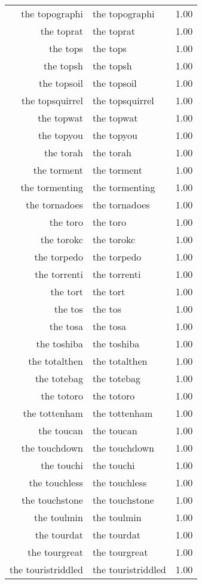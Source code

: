 \begin{table}[ht]
\begin{tabular}{rlr}
  the topographi & the topographi & 1.00 \\ 
  the toprat & the toprat & 1.00 \\ 
  the tops & the tops & 1.00 \\ 
  the topsh & the topsh & 1.00 \\ 
  the topsoil & the topsoil & 1.00 \\ 
  the topsquirrel & the topsquirrel & 1.00 \\ 
  the topwat & the topwat & 1.00 \\ 
  the topyou & the topyou & 1.00 \\ 
  the torah & the torah & 1.00 \\ 
  the torment & the torment & 1.00 \\ 
  the tormenting & the tormenting & 1.00 \\ 
  the tornadoes & the tornadoes & 1.00 \\ 
  the toro & the toro & 1.00 \\ 
  the torokc & the torokc & 1.00 \\ 
  the torpedo & the torpedo & 1.00 \\ 
  the torrenti & the torrenti & 1.00 \\ 
  the tort & the tort & 1.00 \\ 
  the tos & the tos & 1.00 \\ 
  the tosa & the tosa & 1.00 \\ 
  the toshiba & the toshiba & 1.00 \\ 
  the totalthen & the totalthen & 1.00 \\ 
  the totebag & the totebag & 1.00 \\ 
  the totoro & the totoro & 1.00 \\ 
  the tottenham & the tottenham & 1.00 \\ 
  the toucan & the toucan & 1.00 \\ 
  the touchdown & the touchdown & 1.00 \\ 
  the touchi & the touchi & 1.00 \\ 
  the touchless & the touchless & 1.00 \\ 
  the touchstone & the touchstone & 1.00 \\ 
  the toulmin & the toulmin & 1.00 \\ 
  the tourdat & the tourdat & 1.00 \\ 
  the tourgreat & the tourgreat & 1.00 \\ 
  the touristriddled & the touristriddled & 1.00 \\ 

\end{tabular}
\end{table}
